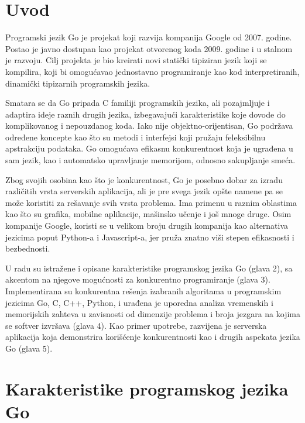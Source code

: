 \documentclass[12pt,oneside]{memoir}
\begin{document}
\frontmatter
\naslovna
\komisija
{}
\apstrakt
\tableofcontents*
\mainmatter

\chapter{Uvod}

Programski jezik Go je projekat koji razvija kompanija Google od 2007. godine. Postao je javno dostupan kao projekat otvorenog koda 2009. godine i u stalnom je razvoju. Cilj projekta je bio kreirati novi statički tipiziran jezik koji se kompilira, koji bi omogućavao jednostavno programiranje kao kod interpretiranih, dinamički tipizarnih programskih jezika. 

Smatara se da Go pripada C familiji programskih jezika, ali pozajmljuje i adaptira ideje raznih drugih jezika, izbegavajući karakteristike koje dovode do komplikovanog i nepouzdanog koda. Iako nije objektno-orijentisan, Go podržava određene koncepte kao što su metodi i interfejsi koji pružaju feleksibilnu apstrakciju podataka. Go omogućava efikasnu konkurentnost koja je ugrađena u sam jezik, kao i automatsko upravljanje memorijom, odnosno sakupljanje smeća. 

Zbog svojih osobina kao što je konkurentnost, Go je posebno dobar za izradu različitih vrsta serverskih aplikacija, ali je pre svega jezik opšte namene pa se može koristiti za rešavanje svih vrsta problema. Ima primenu u raznim oblastima kao što su grafika, mobilne aplikacije, mašinsko učenje i još mnoge druge. Osim kompanije Google, koristi se u velikom broju drugih kompanija kao alternativa jezicima poput Python-a i Javascript-a, jer pruža znatno viši stepen efikasnosti i bezbednosti.

U radu su istražene i opisane karakteristike programskog jezika Go (glava 2), sa akcentom na njegove mogućnosti za konkurentno programiranje (glava 3). Implementirana su konkurentna rešenja izabranih algoritama u programskim jezicima Go, C, C++, Python, i urađena je uporedna analiza vremenskih i memorijskih zahteva u  zavisnosti od dimenzije problema i broja jezgara na kojima se softver izvršava (glava 4). Kao primer upotrebe, razvijena je serverska aplikacija koja demonstrira korišćenje konkurentnosti kao i drugih aspekata jezika Go (glava 5).


\chapter{Karakteristike programskog jezika Go}
\end{document}
